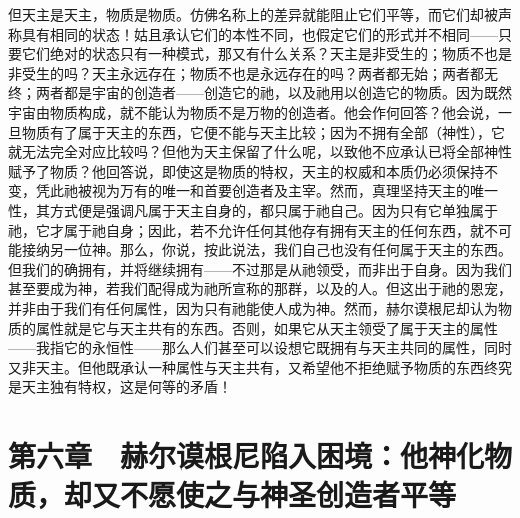 但天主是天主，物质是物质。仿佛名称上的差异就能阻止它们平等，而它们却被声称具有相同的状态！姑且承认它们的本性不同，也假定它们的形式并不相同——只要它们绝对的状态只有一种模式，那又有什么关系？天主是非受生的；物质不也是非受生的吗？天主永远存在；物质不也是永远存在的吗？两者都无始；两者都无终；两者都是宇宙的创造者——创造它的祂，以及祂用以创造它的物质。因为既然宇宙由物质构成，就不能认为物质不是万物的创造者。他会作何回答？他会说，一旦物质有了属于天主的东西，它便不能与天主比较；因为不拥有全部（神性），它就无法完全对应比较吗？但他为天主保留了什么呢，以致他不应承认已将全部神性赋予了物质？他回答说，即使这是物质的特权，天主的权威和本质仍必须保持不变，凭此祂被视为万有的唯一和首要创造者及主宰。然而，真理坚持天主的唯一性，其方式便是强调凡属于天主自身的，都只属于祂自己。因为只有它单独属于祂，它才属于祂自身；因此，若不允许任何其他存有拥有天主的任何东西，就不可能接纳另一位神。那么，你说，按此说法，我们自己也没有任何属于天主的东西。但我们的确拥有，并将继续拥有——不过那是从祂领受，而非出于自身。因为我们甚至要成为神，若我们配得成为祂所宣称的那群，以及的人。但这出于祂的恩宠，并非由于我们有任何属性，因为只有祂能使人成为神。然而，赫尔谟根尼却认为物质的属性就是它与天主共有的东西。否则，如果它从天主领受了属于天主的属性——我指它的永恒性——那么人们甚至可以设想它既拥有与天主共同的属性，同时又非天主。但他既承认一种属性与天主共有，又希望他不拒绝赋予物质的东西终究是天主独有特权，这是何等的矛盾！\par


\section{第六章　赫尔谟根尼陷入困境：他神化物质，却又不愿使之与神圣创造者平等}

